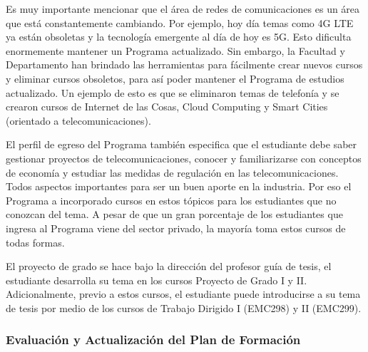Es muy importante mencionar que el área de redes de comunicaciones es un área que está constantemente cambiando. 
Por ejemplo, hoy día temas como 4G LTE ya están obsoletas y la tecnología emergente al día de hoy es 5G. Esto dificulta 
enormemente mantener un Programa actualizado. Sin embargo, la Facultad y Departamento han brindado las herramientas 
para fácilmente crear nuevos cursos y eliminar cursos obsoletos, para así poder mantener el Programa de estudios actualizado.
Un ejemplo de esto es que se eliminaron temas de telefonía y se crearon cursos de Internet de las Cosas, Cloud Computing 
y Smart Cities (orientado a telecomunicaciones).

El perfil de egreso del Programa también especifica que el estudiante debe saber gestionar proyectos de telecomunicaciones, 
conocer y familiarizarse con conceptos de economía y estudiar las medidas de regulación en las telecomunicaciones.
Todos aspectos importantes para ser un buen aporte en la industria. Por eso el Programa a incorporado cursos en estos
tópicos para los estudiantes que no conozcan del tema. A pesar de que un gran porcentaje de los estudiantes que ingresa
al Programa viene del sector privado, la mayoría toma estos cursos de todas formas.

El proyecto de grado se hace bajo la dirección del profesor guía de tesis, el
estudiante desarrolla su tema en los cursos Proyecto de Grado I y II. Adicionalmente,
previo a estos cursos, el estudiante puede introducirse a su tema de tesis por medio
de los cursos de Trabajo Dirigido I (EMC298) y II (EMC299).



\subsubsection{Evaluación y Actualización del Plan de Formación}

